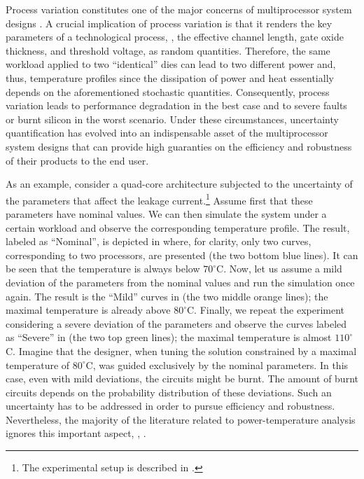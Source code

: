 Process variation constitutes one of the major concerns of multiprocessor system designs \cite{chandrakasan2001, srivastava2010}.
A crucial implication of process variation is that it renders the key parameters of a technological process, \eg, the effective channel length, gate oxide thickness, and threshold voltage, as random quantities.
Therefore, the same workload applied to two ``identical'' dies can lead to two different power and, thus, temperature profiles since the dissipation of power and heat essentially depends on the aforementioned stochastic quantities.
Consequently, process variation leads to performance degradation in the best case and to severe faults or burnt silicon in the worst scenario.
Under these circumstances, uncertainty quantification \cite{xiu2010, eldred2009} has evolved into an indispensable asset of the multiprocessor system designs that can provide high guaranties on the efficiency and robustness of their products to the end user.

As an example, consider a quad-core architecture subjected to the uncertainty of the parameters that affect the leakage current.\footnote{The experimental setup is described in .}
Assume first that these parameters have nominal values. We can then simulate the system under a certain workload and observe the corresponding temperature profile.
The result, labeled as ``Nominal'', is depicted in  where, for clarity, only two curves, corresponding to two processors, are presented (the two bottom blue lines). It can be seen that the temperature is always below $70^{\circ}$C. Now, let us assume a mild deviation of the parameters from the nominal values and run the simulation once again.
The result is the ``Mild'' curves in  (the two middle orange lines); the maximal temperature is already above $80^{\circ}$C.
Finally, we repeat the experiment considering a severe deviation of the parameters and observe the curves labeled as ``Severe'' in  (the two top green lines); the maximal temperature is almost $110^{\circ}$C.
Imagine that the designer, when tuning the solution constrained by a maximal temperature of $80^\circ$C, was guided exclusively by the nominal parameters. In this case, even with mild deviations, the circuits might be burnt.
The amount of burnt circuits depends on the probability distribution of these deviations.
Such an uncertainty has to be addressed in order to pursue efficiency and robustness.
Nevertheless, the majority of the literature related to power-temperature analysis ignores this important aspect, \eg, \cite{rao2009, rai2011, thiele2011, ukhov2012}.



